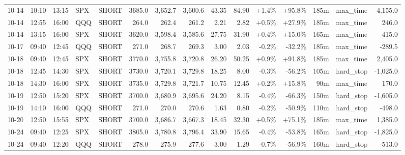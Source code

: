 \documentclass[11pt,a4paper,twoside]{article}
\begin{document}
\begin{landscape}
\begin{center}
\begin{longtable}{>{\color{txtmain}}l l l l l r r r r r r r r >{\color{txtmain}}l r}
10-14 & 10:10 & 13:15 & SPX & SHORT & 3685.0 & 3,652.7 & 3,600.6 & 43.35 & 84.90 & \textcolor{wingreen}{+1.4\%} & \textcolor{wingreen}{+95.8\%} & 185m & max\_time & \textcolor{wingreen}{4,155.0} \\
10-14 & 12:55 & 16:00 & QQQ & SHORT & 264.0 & 262.4 & 261.2 & 2.21 & 2.82 & \textcolor{wingreen}{+0.5\%} & \textcolor{wingreen}{+27.9\%} & 185m & max\_time & \textcolor{wingreen}{246.0} \\
10-14 & 13:15 & 16:00 & SPX & SHORT & 3620.0 & 3,598.4 & 3,585.6 & 27.75 & 31.90 & \textcolor{wingreen}{+0.4\%} & \textcolor{wingreen}{+15.0\%} & 165m & max\_time & \textcolor{wingreen}{415.0} \\
10-17 & 09:40 & 12:45 & QQQ & SHORT & 271.0 & 268.7 & 269.3 & 3.00 & 2.03 & \textcolor{lossred}{-0.2\%} & \textcolor{lossred}{-32.2\%} & 185m & max\_time & \textcolor{lossred}{-289.5} \\
10-18 & 09:40 & 12:45 & SPX & SHORT & 3770.0 & 3,755.8 & 3,720.8 & 26.20 & 50.25 & \textcolor{wingreen}{+0.9\%} & \textcolor{wingreen}{+91.8\%} & 185m & max\_time & \textcolor{wingreen}{2,405.0} \\
10-18 & 12:45 & 14:30 & SPX & SHORT & 3730.0 & 3,720.1 & 3,729.8 & 18.25 & 8.00 & \textcolor{lossred}{-0.3\%} & \textcolor{lossred}{-56.2\%} & 105m & hard\_stop & \textcolor{lossred}{-1,025.0} \\
10-18 & 14:30 & 16:00 & SPX & SHORT & 3735.0 & 3,729.8 & 3,721.7 & 10.75 & 12.45 & \textcolor{wingreen}{+0.2\%} & \textcolor{wingreen}{+15.8\%} & 90m & max\_time & \textcolor{wingreen}{170.0} \\
10-19 & 12:50 & 15:20 & SPX & SHORT & 3700.0 & 3,680.9 & 3,695.6 & 24.20 & 8.15 & \textcolor{lossred}{-0.4\%} & \textcolor{lossred}{-66.3\%} & 150m & hard\_stop & \textcolor{lossred}{-1,605.0} \\
10-19 & 14:10 & 16:00 & QQQ & SHORT & 271.0 & 270.0 & 270.6 & 1.63 & 0.80 & \textcolor{lossred}{-0.2\%} & \textcolor{lossred}{-50.9\%} & 110m & hard\_stop & \textcolor{lossred}{-498.0} \\
10-20 & 12:50 & 15:55 & SPX & SHORT & 3700.0 & 3,686.7 & 3,667.3 & 18.45 & 32.30 & \textcolor{wingreen}{+0.5\%} & \textcolor{wingreen}{+75.1\%} & 185m & max\_time & \textcolor{wingreen}{1,385.0} \\
10-24 & 09:40 & 12:25 & SPX & SHORT & 3805.0 & 3,780.8 & 3,796.4 & 33.90 & 15.65 & \textcolor{lossred}{-0.4\%} & \textcolor{lossred}{-53.8\%} & 165m & hard\_stop & \textcolor{lossred}{-1,825.0} \\
10-24 & 09:40 & 12:20 & QQQ & SHORT & 278.0 & 275.9 & 277.6 & 3.00 & 1.29 & \textcolor{lossred}{-0.7\%} & \textcolor{lossred}{-56.9\%} & 160m & hard\_stop & \textcolor{lossred}{-513.0} \\

\end{longtable}
\end{center}
\end{landscape}
\end{document}
